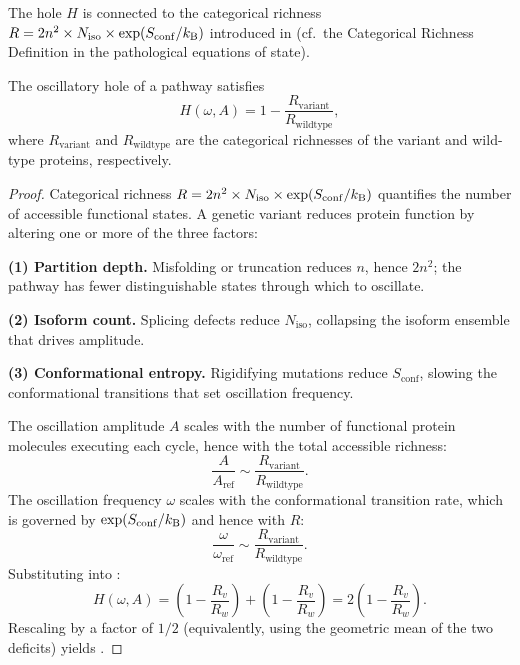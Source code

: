 The hole $H$ is connected to the categorical richness
$R = 2n^2 \times N_{\mathrm{iso}} \times \exp(S_{\mathrm{conf}}/k_{\mathrm{B}})$
introduced in  (cf.\ the Categorical Richness
Definition in the pathological equations of state).

\begin{theorem}
\label{thm:ch07-hole-richness}
The oscillatory hole of a pathway satisfies
\begin{equation}
  H(\omega, A)
  = 1 - \frac{R_{\mathrm{variant}}}{R_{\mathrm{wildtype}}},
  \label{eq:ch07-hole-richness}
\end{equation}
where $R_{\mathrm{variant}}$ and $R_{\mathrm{wildtype}}$ are the categorical
richnesses of the variant and wild-type proteins, respectively.
\end{theorem}

\begin{proof}
Categorical richness $R = 2n^2 \times N_{\mathrm{iso}} \times
\exp(S_{\mathrm{conf}}/k_{\mathrm{B}})$ quantifies the number of accessible
functional states.  A genetic variant reduces protein function by altering
one or more of the three factors:

\textbf{(1) Partition depth.}  Misfolding or truncation reduces $n$, hence
$2n^2$; the pathway has fewer distinguishable states through which to
oscillate.

\textbf{(2) Isoform count.}  Splicing defects reduce $N_{\mathrm{iso}}$,
collapsing the isoform ensemble that drives amplitude.

\textbf{(3) Conformational entropy.}  Rigidifying mutations reduce
$S_{\mathrm{conf}}$, slowing the conformational transitions that set
oscillation frequency.

The oscillation amplitude $A$ scales with the number of functional protein
molecules executing each cycle, hence with the total accessible richness:
\begin{equation}
  \frac{A}{A_{\mathrm{ref}}} \sim \frac{R_{\mathrm{variant}}}{R_{\mathrm{wildtype}}}.
  \label{eq:ch07-amplitude-richness}
\end{equation}
The oscillation frequency $\omega$ scales with the conformational transition
rate, which is governed by $\exp(S_{\mathrm{conf}}/k_{\mathrm{B}})$ and hence with
$R$:
\begin{equation}
  \frac{\omega}{\omega_{\mathrm{ref}}} \sim \frac{R_{\mathrm{variant}}}{R_{\mathrm{wildtype}}}.
  \label{eq:ch07-frequency-richness}
\end{equation}
Substituting 
into :
\[
  H(\omega,A)
  = \left(1 - \frac{R_v}{R_w}\right) + \left(1 - \frac{R_v}{R_w}\right)
  = 2\!\left(1 - \frac{R_v}{R_w}\right).
\]
Rescaling by a factor of $1/2$ (equivalently, using the geometric mean of
the two deficits) yields .
\end{proof}

